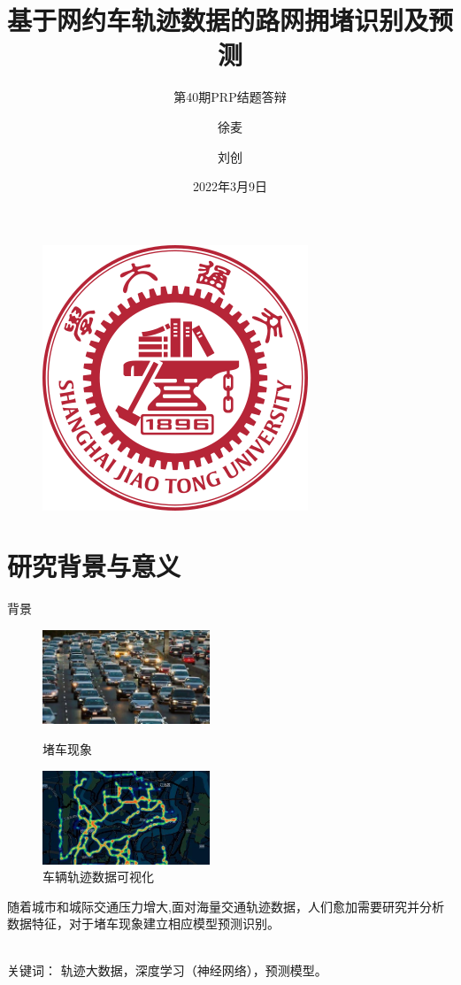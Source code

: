 \documentclass[10pt]{beamer}
\author{徐麦 \and 刘创}
\title{基于网约车轨迹数据的路网拥堵识别及预测}
\subtitle{第40期PRP结题答辩}
\institute{上海交通大学密西根学院 \newline \newline 指导老师: 高林杰}
\date{2022年3月9日}
\begin{document}
\heiti
\begin{frame}
    \titlepage
    \begin{figure}[htpb]
        \begin{center}
            \includegraphics[width=0.18\linewidth]{pic/SJTU.png}
        \end{center}
    \end{figure}
\end{frame}

\begin{frame}
    \tableofcontents[sectionstyle=show,subsectionstyle=show/shaded/hide,subsubsectionstyle=show/shaded/hide]
\end{frame}


\section{研究背景与意义}

\begin{frame}{背景}
\begin{figure}
\centering
\begin{minipage}[t]{0.48\textwidth}
\centering
\includegraphics[width=5cm]{pic/1.png}
\caption{堵车现象}
\end{minipage}
\begin{minipage}[t]{0.48\textwidth}
\centering
\includegraphics[width=5cm]{pic/2.png}
\caption{车辆轨迹数据可视化}
\end{minipage}
\end{figure}
\par 随着城市和城际交通压力增大,面对海量交通轨迹数据，人们愈加需要\alert{研究并分析数据特征}，对于堵车现象建立相应\alert{模型预测识别}。
\\ \hspace*{\fill} \\
\par 关键词：\color{blue} 轨迹大数据，深度学习（神经网络），预测模型。
\end{frame}
\end{document}
